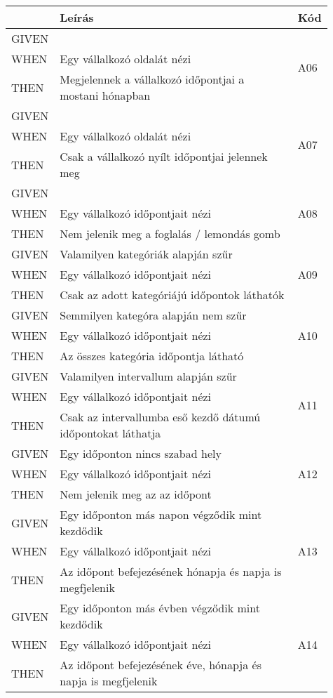 \begin{table}[H]
	\centering
	\begin{tabular}{|m{0.1\linewidth}|m{0.75\linewidth}|m{0.06\linewidth}|}
		\hline
		& \textbf{Leírás} & \textbf{Kód} \\
		\hline
		GIVEN &  & \multirow{3}{*}{A06} \\ \cline{1-2}
		WHEN  & Egy vállalkozó oldalát nézi & \\ \cline{1-2}
		THEN  & Megjelennek a vállalkozó időpontjai a mostani hónapban & \\ 
		\hline
		GIVEN &  & \multirow{3}{*}{A07} \\ \cline{1-2}
		WHEN  & Egy vállalkozó oldalát nézi & \\ \cline{1-2}
		THEN  & Csak a vállalkozó nyílt időpontjai jelennek meg & \\ 
		\hline
		GIVEN &  & \multirow{3}{*}{A08} \\ \cline{1-2}
		WHEN  & Egy vállalkozó időpontjait nézi & \\ \cline{1-2}
		THEN  & Nem jelenik meg a foglalás / lemondás gomb & \\ 
		\hline
		GIVEN & Valamilyen kategóriák alapján szűr & \multirow{3}{*}{A09} \\ \cline{1-2}
		WHEN  & Egy vállalkozó időpontjait nézi & \\ \cline{1-2}
		THEN  & Csak az adott kategóriájú időpontok láthatók & \\ 
		\hline
		GIVEN & Semmilyen kategóra alapján nem szűr & \multirow{3}{*}{A10} \\ \cline{1-2}
		WHEN  & Egy vállalkozó időpontjait nézi & \\ \cline{1-2}
		THEN  & Az összes kategória időpontja látható & \\ 
		\hline
		GIVEN & Valamilyen intervallum alapján szűr & \multirow{3}{*}{A11} \\ \cline{1-2}
		WHEN  & Egy vállalkozó időpontjait nézi & \\ \cline{1-2}
		THEN  & Csak az intervallumba eső kezdő dátumú időpontokat láthatja & \\ 
		\hline
		GIVEN & Egy időponton nincs szabad hely & \multirow{3}{*}{A12} \\ \cline{1-2}
		WHEN  & Egy vállalkozó időpontjait nézi & \\ \cline{1-2}
		THEN  & Nem jelenik meg az az időpont & \\ 
		\hline
		GIVEN & Egy időponton más napon végződik mint kezdődik & \multirow{3}{*}{A13} \\ \cline{1-2}
		WHEN  & Egy vállalkozó időpontjait nézi & \\ \cline{1-2}
		THEN  & Az időpont befejezésének hónapja és napja is megfjelenik & \\ 
		\hline
		GIVEN & Egy időponton más évben végződik mint kezdődik & \multirow{3}{*}{A14} \\ \cline{1-2}
		WHEN  & Egy vállalkozó időpontjait nézi & \\ \cline{1-2}
		THEN  & Az időpont befejezésének éve, hónapja és napja is megfjelenik & \\ 
		\hline
	\end{tabular}
\end{table}


